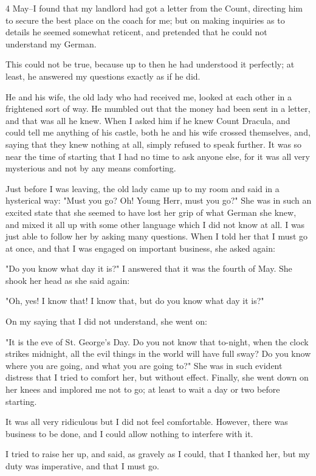 4 May--I found that my landlord had got a letter from the Count, directing him to secure the best place on the coach for me; but on making inquiries as to details he seemed somewhat reticent, and pretended that he could not understand my German. 

This could not be true, because up to then he had understood it perfectly; at least, he answered my questions exactly as if he did. 

He and his wife, the old lady who had received me, looked at each other in a frightened sort of way. He mumbled out that the money had been sent in a letter, and that was all he knew. When I asked him if he knew Count Dracula, and could tell me anything of his castle, both he and his wife crossed themselves, and, saying that they knew nothing at all, simply refused to speak further. It was so near the time of starting that I had no time to ask anyone else, for it was all very mysterious and not by any means comforting. 

Just before I was leaving, the old lady came up to my room and said in a hysterical way: "Must you go? Oh! Young Herr, must you go?" She was in such an excited state that she seemed to have lost her grip of what German she knew, and mixed it all up with some other language which I did not know at all. I was just able to follow her by asking many questions. When I told her that I must go at once, and that I was engaged on important business, she asked again: 

"Do you know what day it is?" I answered that it was the fourth of May. She shook her head as she said again: 

"Oh, yes! I know that! I know that, but do you know what day it is?" 

On my saying that I did not understand, she went on: 

"It is the eve of St. George's Day. Do you not know that to-night, when the clock strikes midnight, all the evil things in the world will have full sway? Do you know where you are going, and what you are going to?" She was in such evident distress that I tried to comfort her, but without effect. Finally, she went down on her knees and implored me not to go; at least to wait a day or two before starting. 

It was all very ridiculous but I did not feel comfortable. However, there was business to be done, and I could allow nothing to interfere with it. 

I tried to raise her up, and said, as gravely as I could, that I thanked her, but my duty was imperative, and that I must go. 

